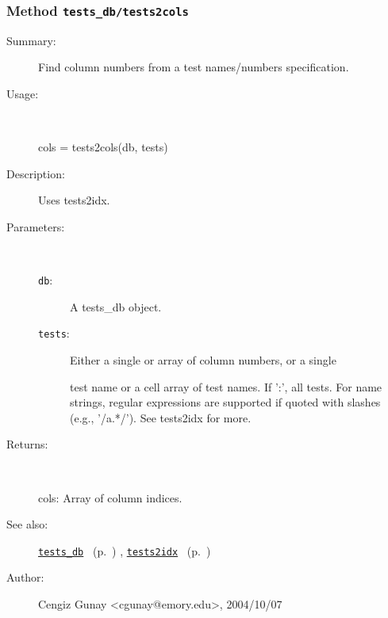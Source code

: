 \subsubsection[Method \texttt{tests2cols}]{Method \texttt{tests\_db/tests2cols}}%
%
\label{ref_tests_db__tests2cols}%
\hypertarget{ref_tests_db__tests2cols}{}%
\begin{description}
\item[Summary:]Find column numbers from a test names/numbers specification.
%
\item[Usage:]~%
\begin{lyxcode}%
cols = tests2cols(db, tests)
%
\end{lyxcode}%
%
\item[Description:]%
Uses tests2idx.
\item[Parameters:]~
\begin{description}%
\item[\texttt{db}:]
 A tests\_db object.
\item[\texttt{tests}:]
 Either a single or array of column numbers, or a single

test name or a cell array of test names. If ':', all
tests. For name strings, regular expressions are
supported if quoted with slashes (e.g., '/a.*/'). 
See tests2idx for more.
\end{description}%
%
\item[Returns:
]~

	cols: Array of column indices.
%
%
\item[See also:]%
\hyperlink{ref_tests_db}{\texttt{tests\_db}}%
\ (p.~\pageref{ref_tests_db})%
%
, \hyperlink{ref_tests2idx}{\texttt{tests2idx}}%
\ (p.~\pageref{ref_tests2idx})%
%
%
\item[Author:]%
Cengiz Gunay <cgunay@emory.edu>, 2004/10/07
%
\end{description}
\methodline%
